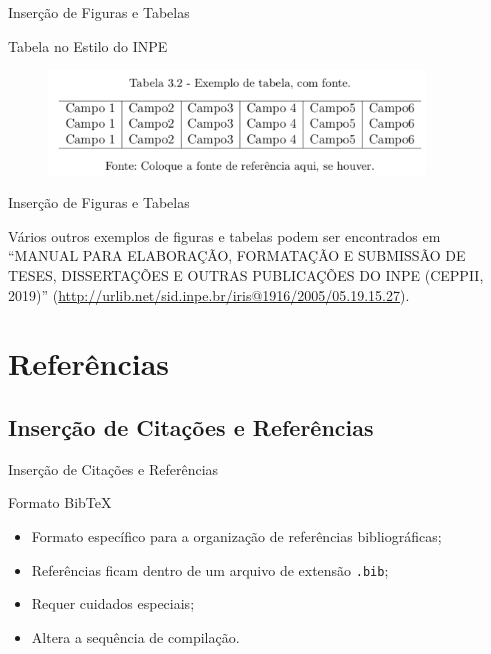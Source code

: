 \documentclass[10pt]{beamer}
\begin{document}
\begin{frame}{Inserção de Figuras e Tabelas}
    \begin{block}{Tabela no Estilo do INPE}
        \begin{figure}[H]
          \begin{center}
            \includegraphics[width=10cm]{./figs/exetabestiinpe.pdf}  
          \end{center}
        \end{figure}
    \end{block}
\end{frame}

\begin{frame}{Inserção de Figuras e Tabelas}
    \begin{marker}
        Vários outros exemplos de figuras e tabelas podem ser encontrados em ``MANUAL PARA ELABORAÇÃO, FORMATAÇÃO E SUBMISSÃO DE TESES, DISSERTAÇÕES E OUTRAS PUBLICAÇÕES DO INPE (CEPPII, 2019)'' (\url{http://urlib.net/sid.inpe.br/iris@1916/2005/05.19.15.27}).
    \end{marker}
\end{frame}

\section{Referências}

\subsection{Inserção de Citações e Referências}

\begin{frame}{Inserção de Citações e Referências}
    \begin{block}{Formato Bib\TeX{}}
        \vspace{1em}
        \begin{itemize}[label=\textbullet]
            \pause
            \item Formato específico para a organização de referências bibliográficas;
            \pause
            \item Referências ficam dentro de um arquivo de extensão {\tt .bib};
            \pause
            \item Requer cuidados especiais;
            \pause
            \item Altera a sequência de compilação.
        \end{itemize}
    \end{block}
\end{frame}
\end{document}
